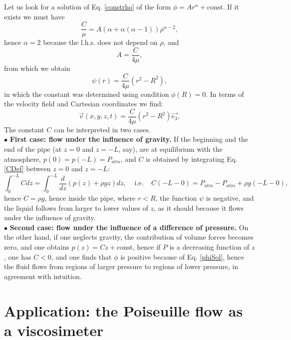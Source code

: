 \documentclass[DIV=12]{article}
\begin{document}
 Let us look for a solution of Eq. \ref{constrho} of the form $\phi = A r^\alpha + {\mathrm{const}}$. If it exists
 we must have
\begin{equation}
\frac{C}{\mu} = A( \alpha + \alpha( \alpha - 1 ) )\rho^{\alpha-2},
\end{equation}
 hence $\alpha = 2$ because the l.h.s. does not depend on $\rho$, and 
\begin{equation}
A = \frac{C}{4\mu},
\end{equation}
from which we obtain
\begin{equation}
\psi(r) = \frac{C}{4\mu}\left( r^2 -R^2\right),
 \label{phiSol}
\end{equation} 
 in which the constant was determined using condition $\phi(R) = 0$. 
 In terms of the velocity field and Cartesian coordinates we find:
\begin{equation}
 \vec{v}( x,y,z,t) =   \frac{C}{4\mu}\left( r^2 - R^2 \right) \vec{e_3},
\end{equation}
The constant $C$ can be interpreted in two cases.\\
$\bullet$ {\bf{First case: flow under the influence of gravity.}} If the beginning and the end of the 
 pipe (at $z=0$ and $z = -L$, say), are at equilibrium with the atmosphere,
 $p (0)= p(-L) = P_{atm}$, and $C$ is obtained by integrating Eq. \ref{CDef}
 between $z=0$ and $z = -L$:\\
\begin{equation}
 \int_0^{-L} C dz = \int_0^{-L} \frac{d}{dz}(  p(z) + \rho g z ) dz,\;\;\;\; {\mathrm{i.e.}} \;\;\;\;C(-L-0) =  P_{atm} - P_{atm} + \rho g (-L-0),
\end{equation}
hence $C= \rho g $, hence inside 
 the pipe, where $r<R$, the function $\psi$  is negative, and the liquid
 follows from larger to lower values of $z$, as it should because it flows under the influence of gravity.\\
$\bullet$ {\bf{Second case: flow under the influence of a difference of pressure.}}
On the other hand, if one neglects gravity, the contribution 
 of volume forces becomes zero, and one obtains $p(z)= Cz + {\mathrm{const}}$, hence if $P$ is a decreasing function
 of $z$, one has $C<0$, and one finds   that $\phi$ is positive because of Eq. \ref{phiSol},
 hence the fluid flows from regions of larger pressure to regions of lower pressure, 
 in agreement with intuition.


\section{Application: the Poiseuille flow as a viscosimeter}
\end{document}
